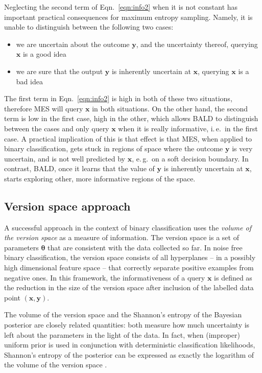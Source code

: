 \documentclass[twoside]{article}
\newcommand{\param}{\bm{\theta}}
\newcommand{\x}{\bm{x}}
\newcommand{\y}{\bm{y}}
\newcommand{\ie}{i.\,e.\ }
\newcommand{\eg}{e.\,g.\ }
\begin{document}
Neglecting the second term of Eqn.\  \eqref{eqn:info2} when it is not constant has important practical consequences for maximum entropy sampling. Namely, it is unable to distinguish between the following two cases:
\begin{itemize}
	\item we are uncertain about the outcome $\y$, and the uncertainty thereof, querying $\x$ is a good idea
	\item we are sure that the output $\y$ is inherently uncertain at $\x$, querying $\x$ is a bad idea
\end{itemize}
The first term in Eqn.\  \eqref{eqn:info2}  is high in both of these two situations, therefore MES will query $\x$ in both situations. On the other hand, the second term is low in the first case, high in the other, which allows BALD to distinguish between the cases and only query $\x$ when it is really informative, \ie in the first case. A practical implication of this is that effect is that MES, when applied to binary classification, gets stuck in regions of space where the outcome $\y$ is very uncertain, and is not well predicted by $\x$, \eg on a soft decision boundary. In contrast, BALD, once it learns that the value of $\y$ is inherently uncertain at $\x$, starts exploring other, more informative regions of the space.


\subsection{Version space approach}

A successful approach in the context of binary classification
\cite{Seung1992,TongKoller2001} uses the \emph{volume of the version space} as a measure of information. The version space is a set of parameters $\param$ that are consistent with the data collected so far. In noise free binary
classification, the version space consists of all hyperplanes -- in a possibly high dimensional feature space -- that correctly
separate positive examples from negative ones. In this framework, the
informativeness of a query $\x$ is defined as the reduction in the size of the
version space after inclusion of the labelled data point $(\x,\y)$.

The volume of the version space and the Shannon's entropy of the Bayesian
posterior are closely related quantities: both measure how much
uncertainty is left about the parameters in the light of the data. In fact,
when (improper) uniform prior is used in conjunction with deterministic
classification likelihoods, Shannon's entropy of the posterior can be
expressed as exactly the logarithm of the volume of the version 
space \cite{Seung1992}.
\end{document}
